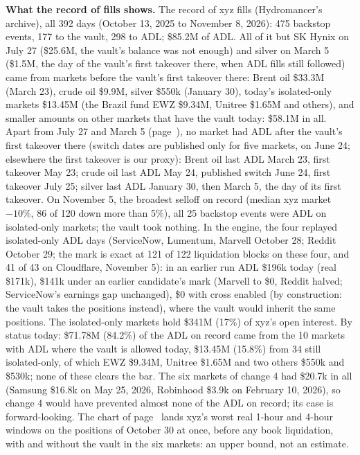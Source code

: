 \documentclass[10.5pt,a4paper]{article}
\newcommand{\resh}[2]{\par\textbf{#1} #2\par}
\begin{document}
\resh{What the record of fills shows.}{The record of xyz fills (Hydromancer's archive), all 392 days (October 13, 2025 to November 8, 2026): 475 backstop events, 177 to the vault, 298 to ADL; \$85.2M of ADL. All of it but SK Hynix on July 27 (\$25.6M, the vault's balance was not enough) and silver on March 5 (\$1.5M, the day of the vault's first takeover there, when ADL fills still followed) came from markets before the vault's first takeover there: Brent oil \$33.3M (March 23), crude oil \$9.9M, silver \$550k (January 30), today's isolated-only markets \$13.45M (the Brazil fund EWZ \$9.34M, Unitree \$1.65M and others), and smaller amounts on other markets that have the vault today: \$58.1M in all. Apart from July 27 and March 5 (page~\pageref{sec:adl}), no market had ADL after the vault's first takeover there (switch dates are published only for five markets, on June 24; elsewhere the first takeover is our proxy): Brent oil last ADL March 23, first takeover May 23; crude oil last ADL May 24, published switch June 24, first takeover July 25; silver last ADL January 30, then March 5, the day of its first takeover. On November 5, the broadest selloff on record (median xyz market $-10\%$, 86 of 120 down more than 5\%), all 25 backstop events were ADL on isolated-only markets; the vault took nothing. In the engine, the four replayed isolated-only ADL days (ServiceNow, Lumentum, Marvell October 28; Reddit October 29; the mark is exact at 121 of 122 liquidation blocks on these four, and 41 of 43 on Cloudflare, November 5): in an earlier run ADL \$196k today (real \$171k), \$141k under an earlier candidate's mark (Marvell to \$0, Reddit halved; ServiceNow's earnings gap unchanged), \$0 with cross enabled (by construction: the vault takes the positions instead), where the vault would inherit the same positions. The isolated-only markets hold \$341M (17\%) of xyz's open interest. By status today: \$71.78M (84.2\%) of the ADL on record came from the 10 markets with ADL where the vault is allowed today, \$13.45M (15.8\%) from 34 still isolated-only, of which EWZ \$9.34M, Unitree \$1.65M and two others \$550k and \$530k; none of these clears the bar. The six markets of change 4 had \$20.7k in all (Samsung \$16.8k on May 25, 2026, Robinhood \$3.9k on February 10, 2026), so change 4 would have prevented almost none of the ADL on record; its case is forward-looking. The chart of page~\pageref{sec:ceiling} lands xyz's worst real 1-hour and 4-hour windows on the positions of October 30 at once, before any book liquidation, with and without the vault in the six markets: an upper bound, not an estimate.}
\end{document}
